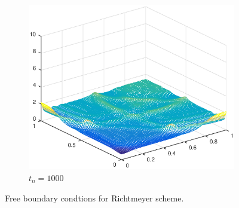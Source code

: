 \begin{figure}[h!]
\begin{subfigure}[t]{0.48\textwidth}
        \includegraphics[width=\textwidth]{images/sol_ri_1000.eps}
        \caption{$t_{n}=1000$}
        \label{fig:100}
    \end{subfigure}
    \caption{Free boundary condtions for Richtmeyer scheme.}
    \label{fig:2DSolutions_ri}
\end{figure}





